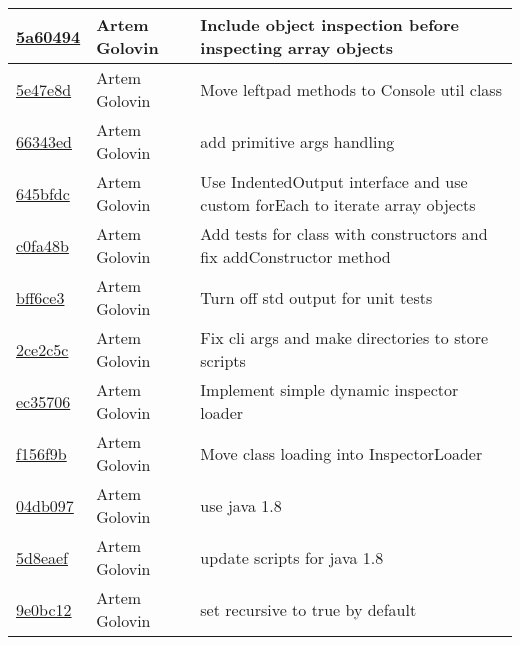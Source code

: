 \begin{tabularx}{\textwidth}{l l X}
\href{https://github.com/awave1/ObjectInspector/commit/5a60494c178ae449c73b64573945d738fa660fbc}{5a60494} & Artem Golovin & Include object inspection before inspecting array objects\\ \hline
\href{https://github.com/awave1/ObjectInspector/commit/5e47e8d3c80ca582c40d589319183ff8bbc04975}{5e47e8d} & Artem Golovin & Move leftpad methods to Console util class\\ \hline
\href{https://github.com/awave1/ObjectInspector/commit/66343ed9e306d8d95fc154743233476df9d8e01b}{66343ed} & Artem Golovin & add primitive args handling\\ \hline
\href{https://github.com/awave1/ObjectInspector/commit/645bfdce0ecb6be66d752fd30a505777d78f0cc4}{645bfdc} & Artem Golovin & Use IndentedOutput interface and use custom forEach to iterate array objects\\ \hline
\href{https://github.com/awave1/ObjectInspector/commit/c0fa48ba955e0b6b2a3a5b4cea0799a48608cd52}{c0fa48b} & Artem Golovin & Add tests for class with constructors and fix addConstructor method\\ \hline
\href{https://github.com/awave1/ObjectInspector/commit/bff6ce3c5e65af191b41dbea9ac64098c79f8d77}{bff6ce3} & Artem Golovin & Turn off std output for unit tests\\ \hline
\href{https://github.com/awave1/ObjectInspector/commit/2ce2c5cbcab69a44628f32983d441161834f1c94}{2ce2c5c} & Artem Golovin & Fix cli args and make directories to store scripts\\ \hline
\href{https://github.com/awave1/ObjectInspector/commit/ec357060b553399d386e08a757cf66dfdc4cd7a8}{ec35706} & Artem Golovin & Implement simple dynamic inspector loader\\ \hline
\href{https://github.com/awave1/ObjectInspector/commit/f156f9b121be09cd64888343984a15e279719ded}{f156f9b} & Artem Golovin & Move class loading into InspectorLoader\\ \hline
\href{https://github.com/awave1/ObjectInspector/commit/04db097989e2c8f71446b8f012f509a6132645c8}{04db097} & Artem Golovin & use java 1.8\\ \hline
\href{https://github.com/awave1/ObjectInspector/commit/5d8eaeff2d1d2ee2cce366d225657b37b16ae0fd}{5d8eaef} & Artem Golovin & update scripts for java 1.8\\ \hline
\href{https://github.com/awave1/ObjectInspector/commit/9e0bc1287fc27e5ed1d0be29bcf8d116e50d972a}{9e0bc12} & Artem Golovin & set recursive to true by default\\ \hline
\end{tabularx}
